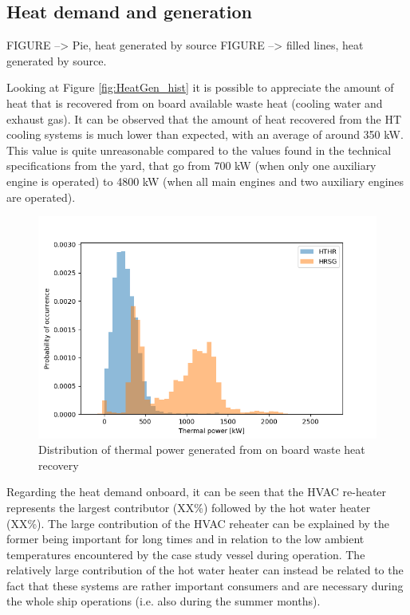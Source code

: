\documentclass[preprint,12pt]{elsarticle}
\begin{document}
\subsection{Heat demand and generation} \label{sec:res:heat}

FIGURE --> Pie, heat generated by source
FIGURE --> filled lines, heat generated by source.

Looking at Figure \ref{fig:HeatGen_hist} it is possible to appreciate the amount of heat that is recovered from on board available waste heat (cooling water and exhaust gas). It can be observed that the amount of heat recovered from the HT cooling systems is much lower than expected, with an average of around 350 kW. This value is quite unreasonable compared to the values found in the technical specifications from the yard, that go from 700 kW (when only one auxiliary engine is operated) to 4800 kW (when all main engines and two auxiliary engines are operated). 
\\
\begin{figure}
	\centering
	\includegraphics[width=0.99\linewidth]{Figures/HeatGen_hist}
	\caption{Distribution of thermal power generated from on board waste heat recovery}
	\label{fig:Hist_WHR}
\end{figure}

Regarding the heat demand onboard, it can be seen that the HVAC re-heater represents the largest contributor (XX\%) followed by the hot water heater (XX\%). The large contribution of the HVAC reheater can be explained by the former being important for long times and in relation to the low ambient temperatures encountered by the case study vessel during operation. The relatively large contribution of the hot water heater can instead be related to the fact that these systems are rather important consumers and are necessary during the whole ship operations (i.e. also during the summer months).
\end{document}
